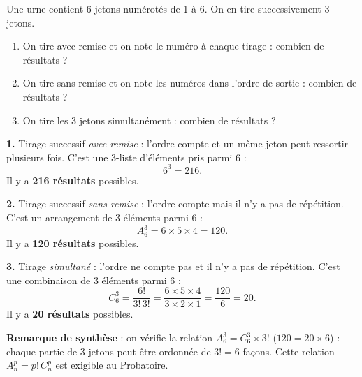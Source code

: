 \documentclass[11pt]{article}
\begin{document}
\begin{exoresolu}
Une urne contient 6 jetons numérotés de 1 à 6. On en tire successivement 3 jetons.
\begin{enumerate}
\item On tire avec remise et on note le numéro à chaque tirage : combien de résultats ?
\item On tire sans remise et on note les numéros dans l'ordre de sortie : combien de résultats ?
\item On tire les 3 jetons simultanément : combien de résultats ?
\end{enumerate}
\tcblower
\textbf{1.} Tirage successif \emph{avec remise} : l'ordre compte et un même jeton peut ressortir plusieurs fois. C'est une 3-liste d'éléments pris parmi 6 :
\[ 6^3=216. \]
Il y a \textbf{216 résultats} possibles.

\textbf{2.} Tirage successif \emph{sans remise} : l'ordre compte mais il n'y a pas de répétition. C'est un arrangement de 3 éléments parmi 6 :
\[ A_6^3=6\times 5\times 4=120. \]
Il y a \textbf{120 résultats} possibles.

\textbf{3.} Tirage \emph{simultané} : l'ordre ne compte pas et il n'y a pas de répétition. C'est une combinaison de 3 éléments parmi 6 :
\[ C_6^3=\frac{6!}{3!\,3!}=\frac{6\times 5\times 4}{3\times 2\times 1}=\frac{120}{6}=20. \]
Il y a \textbf{20 résultats} possibles.

\textbf{Remarque de synthèse} : on vérifie la relation $A_6^3=C_6^3\times 3!$ ($120=20\times 6$) : chaque partie de 3 jetons peut être ordonnée de $3!=6$ façons. Cette relation $A_n^p=p!\,C_n^p$ est exigible au Probatoire.
\end{exoresolu}
\end{document}

